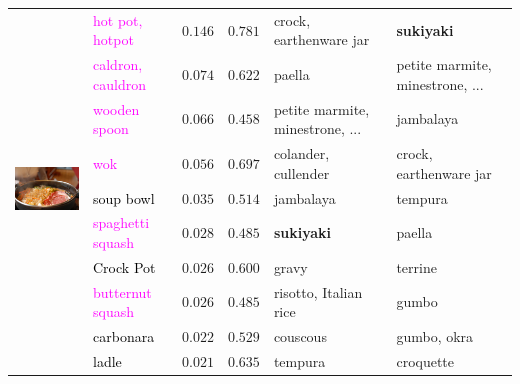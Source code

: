 \documentclass[11pt,letterpaper]{article}
\begin{document}
\begin{table}[t]
\begin{center}
\begin{small}
{\begin{tabular}{clrrll}
\multirow{10}{*}{\includegraphics[height=10em]{n07879174_6939.JPEG}}
& \textcolor{magenta}{hot pot, hotpot} & $0.146$& $0.781$& crock, earthenware jar& \textbf{sukiyaki} \\
& \textcolor{magenta}{caldron, cauldron} & $0.074$& $0.622$& paella& petite marmite, minestrone, ... \\
& \textcolor{magenta}{wooden spoon} & $0.066$& $0.458$& petite marmite, minestrone, ...& jambalaya \\
& \textcolor{magenta}{wok} & $0.056$& $0.697$& colander, cullender& crock, earthenware jar \\
& \textcolor{black}{soup bowl} & $0.035$& $0.514$& jambalaya& tempura \\
& \textcolor{magenta}{spaghetti squash} & $0.028$& $0.485$& \textbf{sukiyaki}& paella \\
& \textcolor{black}{Crock Pot} & $0.026$& $0.600$& gravy& terrine \\
& \textcolor{magenta}{butternut squash} & $0.026$& $0.485$& risotto, Italian rice& gumbo \\
& \textcolor{black}{carbonara} & $0.022$& $0.529$& couscous& gumbo, okra \\
& \textcolor{black}{ladle} & $0.021$& $0.635$& tempura& croquette \\

\midrule



\end{tabular}}
\end{small}
\end{center}
\end{table}
\end{document}
